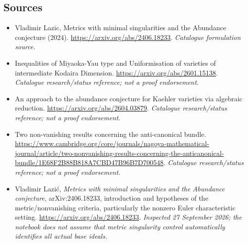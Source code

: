 \documentclass[11pt,a4paper]{article}
\numberwithin{equation}{section}
\begin{document}
\subsection{Sources}
\begin{itemize}\raggedright
\item[\textnormal{[S1]}]\hypertarget{source:30006714:1}{} Vladimir Lazic, Metrics with minimal singularities and the Abundance conjecture (2024).
\url{https://arxiv.org/abs/2406.18233}.
{\small\textit{Catalogue formulation source.}}
\item[\textnormal{[S2]}]\hypertarget{source:30006714:2}{} Inequalities of Miyaoka-Yau type and Uniformisation of varieties of intermediate Kodaira Dimension.
\url{https://arxiv.org/abs/2601.15138}.
{\small\textit{Catalogue research/status reference; not a proof endorsement.}}
\item[\textnormal{[S3]}]\hypertarget{source:30006714:3}{} An approach to the abundance conjecture for Kaehler varieties via algebraic reduction.
\url{https://arxiv.org/abs/2604.03879}.
{\small\textit{Catalogue research/status reference; not a proof endorsement.}}
\item[\textnormal{[S4]}]\hypertarget{source:30006714:4}{} Two non-vanishing results concerning the anti-canonical bundle.
\url{https://www.cambridge.org/core/journals/nagoya-mathematical-journal/article/two-nonvanishing-results-concerning-the-anticanonical-bundle/1E68F2B88B818A7CBD47B96B7D700548}.
{\small\textit{Catalogue research/status reference; not a proof endorsement.}}
\item[\textnormal{[E1]}]\hypertarget{extra:30006714:1}{} Vladimir Lazi\'c,
\emph{Metrics with minimal singularities and the Abundance conjecture},
arXiv:2406.18233, introduction and hypotheses of the metric/nonvanishing
criteria, particularly the nonzero Euler characteristic setting.
\url{https://arxiv.org/abs/2406.18233}.
{\small\textit{Inspected 27 September 2026; the notebook does not assume
that metric singularity control automatically identifies all actual base ideals.}}
\end{itemize}
\end{document}
